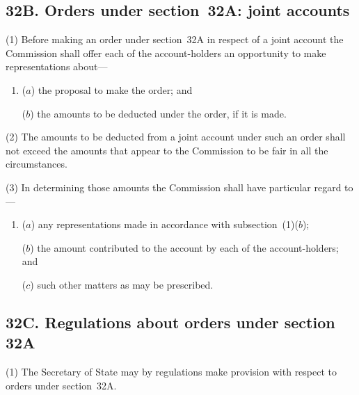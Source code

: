 \documentclass[12pt,a4paper]{article}
\begin{document}
\subsection{32B. Orders under section~32A: joint accounts}

(1) Before making an order under section~32A in respect of a joint account 
the Commission shall offer each of the account-holders an opportunity to make representations about---
\begin{enumerate}\item[]
($a$) the proposal to make the order; and

($b$) the amounts to be deducted under the order, if it is made.
\end{enumerate}

(2)
The amounts to be deducted from a joint account under such an order shall not exceed the amounts that appear to the Commission to be fair in all the circumstances.

(3)
In determining those amounts the Commission shall have particular regard to---
\begin{enumerate}\item[]
($a$) any representations made in accordance with subsection~(1)($b$);

\begin{sloppypar}
($b$) the amount contributed to the account by each of the account-holders; and
\end{sloppypar}

($c$) such other matters as may be prescribed.
\end{enumerate}

\subsection{32C. Regulations about orders under section 32A}

(1) The Secretary of State may by regulations make provision with respect
to orders under section~32A.
\end{document}
